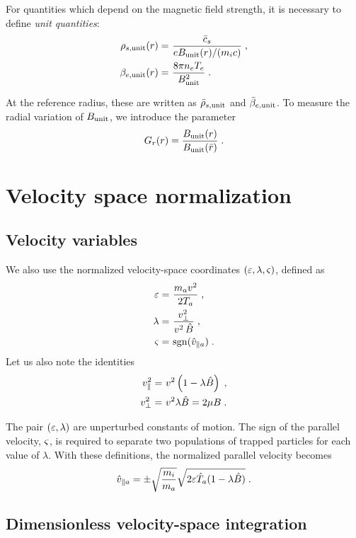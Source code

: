 For quantities which depend on the magnetic field 
strength, it is necessary to define {\it unit quantities}:
%
\begin{align}
\rho_{s,{\rm unit}}(r) = &~\frac{\bar{c}_s}{e B_{\rm unit}(r) / (m_i c)} \; , \\
\beta_{e,{\rm unit}}(r) = &~\frac{8 \pi n_e T_e}{B_{\rm unit}^2} \; .
\end{align}

\noindent
At the reference radius, these are written as 
$\bar{\rho}_{s,{\rm unit}}$ and $\bar{\beta}_{e,{\rm unit}}$.  To measure the radial variation 
of $B_{\rm unit}$, we introduce the parameter
%
\begin{equation}
G_r(r) = \frac{B_{\rm unit}(r)}{B_{\rm unit}(\bar{r})} \; .
\label{eq.gr}
\end{equation}

\section{Velocity space normalization} 

\subsection{Velocity variables}

We also use the normalized velocity-space coordinates 
$({\varepsilon},\lambda,{\varsigma})$, 
defined as
%
\begin{align}
{\varepsilon} = &~\frac{m_a v^2}{2 T_a} \; , \\
\lambda = &~\frac{v_\perp^2}{v^2 \, \hat{B}}  \; , \\
{\varsigma} = &~{\rm sgn} (\hat{v}_{\parallel a}) \; .
\end{align}
%
Let us also note the identities
%
\begin{align}
v_\parallel^2 = &~v^2 \left( 1-\lambda \hat{B} \right) \; , \\
v_\perp^2 = &~v^2 \lambda \hat{B} = 2 \mu B \; .
\end{align}

\noindent
The pair $({\varepsilon},\lambda)$ are unperturbed constants of motion. 
The sign of the parallel velocity, ${\varsigma}$, is required to separate
two populations of trapped particles for each value of $\lambda$. 
With these definitions, the normalized parallel velocity becomes
%
\begin{equation}
\hat{v}_{\parallel a} = \pm \sqrt{\frac{m_i}{m_a}} \sqrt{2{\varepsilon} \hat{T}_a (1-\lambda\hat{B})}
\; .
\end{equation}

\subsection{Dimensionless velocity-space integration}

